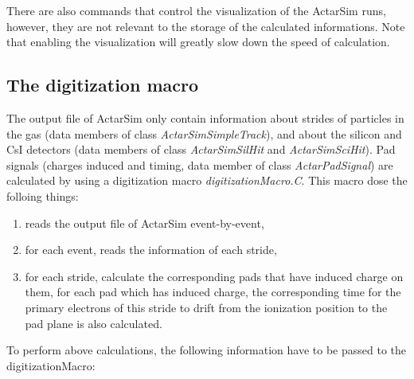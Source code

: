 There are also commands that control the visualization of the ActarSim runs, however, they are not relevant to the storage of the calculated informations. Note that enabling the visualization will greatly slow down the speed of calculation.

\subsection{The digitization macro}

The output file of ActarSim only contain information about strides of particles in the gas (data members of class \textit{ActarSimSimpleTrack}), and about the silicon and CsI detectors (data members of class \textit{ActarSimSilHit} and \textit{ActarSimSciHit}). Pad signals (charges induced and timing, data member of class \textit{ActarPadSignal}) are calculated by using a digitization macro \textit{digitizationMacro.C}. This macro dose the folloing things:
\begin{enumerate}
 \item reads the output file of ActarSim event-by-event,
 \item for each event, reads the information of each stride,
 \item for each stride, calculate the corresponding pads that have induced charge on them, for each pad which has induced charge, the corresponding time for the primary electrons of this stride to drift from the ionization position to the pad plane is also calculated.
\end{enumerate}

To perform above calculations, the following information have to be passed to the digitizationMacro:

